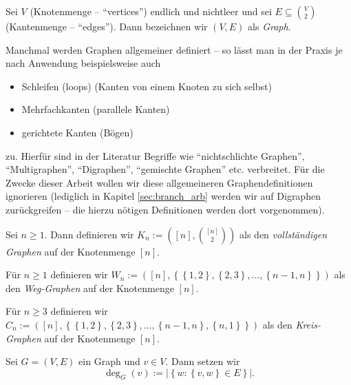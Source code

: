 \documentclass[10p,a4paper,BCOR = 12mm, DIV=15]{scrbook}
\begin{document}
\begin{Def}
Sei $V$ (Knotenmenge -- "`vertices"') endlich und nichtleer und sei $E \subseteq {V \choose 2}$ (Kantenmenge -- "`edges"'). Dann bezeichnen wir $\left(V, E\right)$ als \emph{Graph}.
\end{Def}

\begin{Bem}
Manchmal werden Graphen allgemeiner definiert -- so lässt man in der Praxis je nach Anwendung beispielsweise auch
\begin{itemize}
\item Schleifen (loops) (Kanten von einem Knoten zu sich selbst)
\item Mehrfachkanten (parallele Kanten)
\item gerichtete Kanten (Bögen)
\end{itemize}
zu. Hierfür sind in der Literatur Begriffe wie "`nichtschlichte Graphen"', "`Multigraphen"', "`Digraphen"', "`gemischte Graphen"' etc. verbreitet. Für die Zwecke dieser Arbeit wollen wir diese allgemeineren Graphendefinitionen ignorieren (lediglich in Kapitel \ref{sec:branch_arb} werden wir auf Digraphen zurückgreifen -- die hierzu nötigen Definitionen werden dort vorgenommen).
\end{Bem}

\begin{BspDef}
Sei $n \geq 1$. Dann definieren wir $K_n := \left(\left[n\right], {\left[n\right] \choose 2}\right)$ als den \emph{vollständigen Graphen} auf der Knotenmenge $\left[n\right]$.

Für $n \geq 1$ definieren wir $W_n := \left(\left[n\right], \left\{\left\{1, 2\right\}, \left\{2, 3\right\}, \ldots, \left\{n-1, n\right\}\right\}\right)$ als den \emph{Weg-Graphen} auf der Knotenmenge $\left[n\right]$.

Für $n \geq 3$ definieren wir $C_n := \left(\left[n\right], \left\{\left\{1, 2\right\}, \left\{2, 3\right\}, \ldots, \left\{n-1, n\right\}, \left\{n, 1\right\}\right\}\right)$ als den \emph{Kreis-Graphen} auf der Knotenmenge $\left[n\right]$.
\end{BspDef}

\begin{Def}
Sei $G=(V, E)$ ein Graph und $v\in V$. Dann setzen wir 
\begin{displaymath}
\deg_G\left(v\right) := \left|\left\{w: \left\{v, w\right\} \in E\right\}\right|.
\end{displaymath}
\end{Def}
\end{document}
